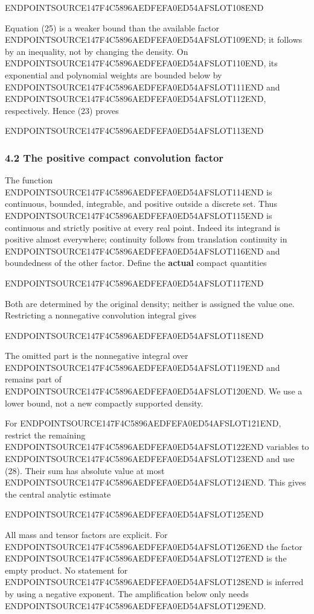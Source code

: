 ENDPOINTSOURCE147F4C5896AEDFEFA0ED54AFSLOT108END

Equation (25) is a weaker bound than the available factor ENDPOINTSOURCE147F4C5896AEDFEFA0ED54AFSLOT109END; it follows by an inequality, not by changing the density. On ENDPOINTSOURCE147F4C5896AEDFEFA0ED54AFSLOT110END, its exponential and polynomial weights are bounded below by ENDPOINTSOURCE147F4C5896AEDFEFA0ED54AFSLOT111END and ENDPOINTSOURCE147F4C5896AEDFEFA0ED54AFSLOT112END, respectively. Hence (23) proves

ENDPOINTSOURCE147F4C5896AEDFEFA0ED54AFSLOT113END

\subsubsection{4.2 The positive compact convolution factor}\label{endpoint-arithmetic_original--the-positive-compact-convolution-factor}

The function ENDPOINTSOURCE147F4C5896AEDFEFA0ED54AFSLOT114END is continuous, bounded, integrable, and positive outside a discrete set. Thus ENDPOINTSOURCE147F4C5896AEDFEFA0ED54AFSLOT115END is continuous and strictly positive at every real point. Indeed its integrand is positive almost everywhere; continuity follows from translation continuity in ENDPOINTSOURCE147F4C5896AEDFEFA0ED54AFSLOT116END and boundedness of the other factor. Define the \textbf{actual} compact quantities

ENDPOINTSOURCE147F4C5896AEDFEFA0ED54AFSLOT117END

Both are determined by the original density; neither is assigned the value one. Restricting a nonnegative convolution integral gives

ENDPOINTSOURCE147F4C5896AEDFEFA0ED54AFSLOT118END

The omitted part is the nonnegative integral over ENDPOINTSOURCE147F4C5896AEDFEFA0ED54AFSLOT119END and remains part of ENDPOINTSOURCE147F4C5896AEDFEFA0ED54AFSLOT120END. We use a lower bound, not a new compactly supported density.

For ENDPOINTSOURCE147F4C5896AEDFEFA0ED54AFSLOT121END, restrict the remaining ENDPOINTSOURCE147F4C5896AEDFEFA0ED54AFSLOT122END variables to ENDPOINTSOURCE147F4C5896AEDFEFA0ED54AFSLOT123END and use (28). Their sum has absolute value at most ENDPOINTSOURCE147F4C5896AEDFEFA0ED54AFSLOT124END. This gives the central analytic estimate

ENDPOINTSOURCE147F4C5896AEDFEFA0ED54AFSLOT125END

All mass and tensor factors are explicit. For ENDPOINTSOURCE147F4C5896AEDFEFA0ED54AFSLOT126END the factor ENDPOINTSOURCE147F4C5896AEDFEFA0ED54AFSLOT127END is the empty product. No statement for ENDPOINTSOURCE147F4C5896AEDFEFA0ED54AFSLOT128END is inferred by using a negative exponent. The amplification below only needs ENDPOINTSOURCE147F4C5896AEDFEFA0ED54AFSLOT129END.

